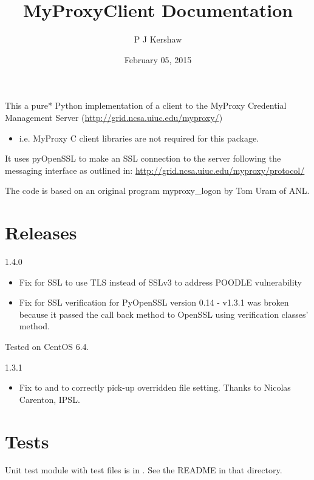 \documentclass[letterpaper,10pt,english]{sphinxmanual}
\title{MyProxyClient Documentation}
\date{February 05, 2015}
\author{P J Kershaw}
\begin{document}
\maketitle
\tableofcontents
{}\label{README::doc}


This a pure* Python implementation of a client to the MyProxy Credential
Management Server (\href{http://grid.ncsa.uiuc.edu/myproxy/}{http://grid.ncsa.uiuc.edu/myproxy/})
\begin{itemize}
\item {} 
i.e. MyProxy C client libraries are not required for this package.

\end{itemize}

It uses pyOpenSSL to make an SSL connection to the server following the
messaging interface as outlined in: \href{http://grid.ncsa.uiuc.edu/myproxy/protocol/}{http://grid.ncsa.uiuc.edu/myproxy/protocol/}

The code is based on an original program myproxy\_logon by Tom Uram of ANL.


\chapter{Releases}
\label{README:releases}\label{README:myproxy-client-package}
1.4.0
\begin{itemize}
\item {} 
Fix for SSL to use TLS instead of SSLv3 to address POODLE vulnerability

\item {} 
Fix for SSL verification for PyOpenSSL version 0.14 - v1.3.1 was broken
because it passed the call back method to OpenSSL using verification classes'
 method.

\end{itemize}

Tested on CentOS 6.4.

1.3.1
\begin{itemize}
\item {} 
Fix to  and 
to correctly pick-up overridden file setting.  Thanks to Nicolas Carenton,
IPSL.

\end{itemize}


\chapter{Tests}
\label{README:tests}
Unit test module with test files is in .  See the README in that
directory.
\end{document}
